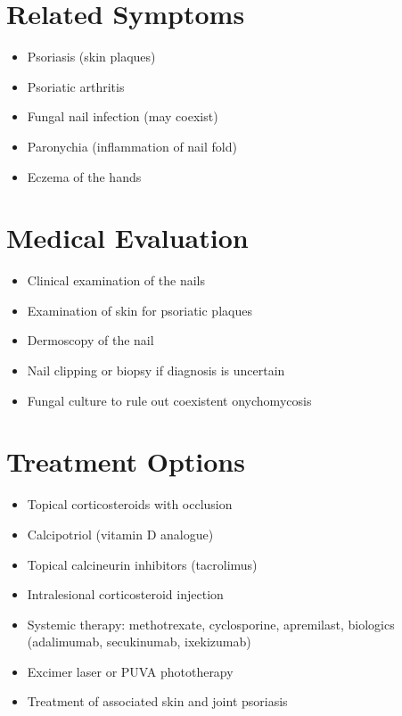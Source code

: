 \section*{Related Symptoms}
\begin{itemize}
\item Psoriasis (skin plaques)
\item Psoriatic arthritis
\item Fungal nail infection (may coexist)
\item Paronychia (inflammation of nail fold)
\item Eczema of the hands
\end{itemize}

\section*{Medical Evaluation}
\begin{itemize}
\item Clinical examination of the nails
\item Examination of skin for psoriatic plaques
\item Dermoscopy of the nail
\item Nail clipping or biopsy if diagnosis is uncertain
\item Fungal culture to rule out coexistent onychomycosis
\end{itemize}

\section*{Treatment Options}
\begin{itemize}
\item Topical corticosteroids with occlusion
\item Calcipotriol (vitamin D analogue)
\item Topical calcineurin inhibitors (tacrolimus)
\item Intralesional corticosteroid injection
\item Systemic therapy: methotrexate, cyclosporine, apremilast, biologics (adalimumab, secukinumab, ixekizumab)
\item Excimer laser or PUVA phototherapy
\item Treatment of associated skin and joint psoriasis
\end{itemize}

